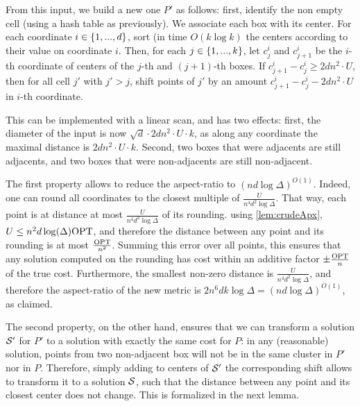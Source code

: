 From this input, we build a new one $P'$ as follows: first, identify the non empty cell (using a hash table as previously). We associate each box with its center.
For each coordinate $i \in \left\{ 1, ..., d \right\}$, sort (in time $O(k \log k)$ the centers according to their value on coordinate $i$. Then, for each $j \in \left\{ 1, ..., k\right\}$, let $c^i_j$ and $c^i_{j+1}$ be the $i$-th coordinate of centers of the $j$-th and $(j+1)$-th boxes. If $c^i_{j+1} - c^i_j \geq 2d n^2\cdot U$, then for all cell $j'$ with $j' > j$, shift points  of $j'$ by an amount $c^i_{j+1} - c^i_j - 2d n^2\cdot U$ in $i$-th coordinate.


This can be implemented with a linear scan, and has two effects: first, the diameter of the input is now $\sqrt{d} \cdot 2d n^2\cdot U \cdot k$, as along any coordinate the maximal distance is $2d n^2\cdot U \cdot k$. Second, two boxes that were adjacents are still adjacents, and two boxes that were non-adjacents are still non-adjacent.

The first property allows to reduce the aspect-ratio to $(nd \log \Delta)^{O(1)}$. Indeed, one can round all coordinates to the closest multiple of $\frac{U}{n^4 d^{2} \log \Delta}$. That way, each point is at distance at most $\frac{U}{n^4 d^{2} \log \Delta}$ of its rounding. using \cref{lem:crudeApx}, $U \leq n^2 d \log(\Delta) \text{OPT}$, and therefore the distance between any point and its rounding is at most $\frac{\text{OPT}}{n^2}$. Summing this error over all points, this ensures that any solution computed on the rounding has cost within an additive factor $\pm \frac{\text{OPT}}{n}$ of the true cost. Furthermore, the smallest non-zero distance is $\frac{U}{n^4 d^{2} \log \Delta}$, and therefore the aspect-ratio of the new metric is $2 n^6 d k \log \Delta = (nd \log \Delta)^{O(1)}$, as claimed.

The second property, on the other hand, ensures that we can transform a solution $\mathcal S'$ for $P'$ to a solution with exactly the same cost for $P$: in any (reasonable) solution, points from two non-adjacent box will not be in the same cluster in $P'$ nor in $P$. Therefore, simply adding to centers of $\mathcal S'$ the corresponding shift allows to transform it to a solution $\mathcal S$, such that the distance between any point and its closest center does not change. This is formalized in the next lemma.

